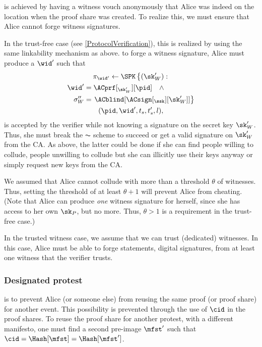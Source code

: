  is achieved by having a witness vouch anonymously that Alice was indeed on the location when the proof share was created.
To realize this, we must ensure that Alice cannot forge witness signatures.

In the trust-free case (see \cref{ProtocolVerification}), this is realized by 
using the same linkability mechanism as above.
\Ie to forge a witness signature, Alice must produce a \(\wid'\) such that
\begin{multline*}
  \pi_{\wid'}\gets \SPK\left\{ (\sk_W') : \right. \\
    \begin{aligned}
      \wid' &= \ACprf[_{\sk_W'}][\pid] \quad \land \\
      \sigma_W'' &= \left. \ACblind[\ACsign[_{\ssk}][\sk_W']] \right\}
    \end{aligned} \\
      (\pid, \wid', t_s, t_s', l),
\end{multline*}
is accepted by the verifier while not knowing a signature on the secret key 
\(\sk_W'\).
Thus, she must break the \(\AC\) scheme to succeed or get a valid signature on \(\sk_W'\) from the \ac{CA}.
As above, the latter could be done if she can find people willing to collude, 
people unwilling to collude but she can illicitly use their keys anyway or 
simply request new keys from the \ac{CA}.

We assumed that Alice cannot collude with more than a threshold \(\theta\) of 
witnesses.
Thus, setting the threshold of at least \(\theta+1\) will prevent Alice from 
cheating.
(Note that Alice can produce \emph{one} witness signature for herself, since 
she has access to her own \(\sk_P\), but no more.
Thus, \(\theta > 1\) is a requirement in the trust-free case.)

In the trusted witness case, we assume that we can trust (dedicated) witnesses.
In this case, Alice must be able to forge statements, \eg digital signatures, 
from at least one witness that the verifier trusts.

\subsubsection{Designated protest}%
\label{analysis-designated}

 is to prevent Alice (or someone else) from reusing the same proof (or proof share) for another event.
This possibility is prevented through the use of \(\cid\) in the proof shares.
To reuse the proof share for another protest, with a different manifesto, one 
must find a second pre-image \(\mfst'\) such that \(\cid = \Hash[\mfst] = 
  \Hash[\mfst']\).

